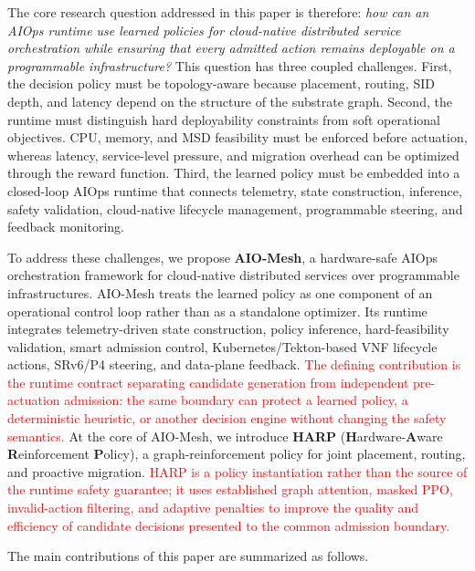 \documentclass[final,5p]{elsarticle}
\newcommand{\rev}[1]{\textcolor{red}{#1}}
\begin{document}
The core research question addressed in this paper is therefore: \emph{how can an AIOps runtime use learned policies for cloud-native distributed service orchestration while ensuring that every admitted action remains deployable on a programmable infrastructure?} This question has three coupled challenges. First, the decision policy must be topology-aware because placement, routing, SID depth, and latency depend on the structure of the substrate graph. Second, the runtime must distinguish hard deployability constraints from soft operational objectives. CPU, memory, and MSD feasibility must be enforced before actuation, whereas latency, service-level pressure, and migration overhead can be optimized through the reward function. Third, the learned policy must be embedded into a closed-loop AIOps runtime that connects telemetry, state construction, inference, safety validation, cloud-native lifecycle management, programmable steering, and feedback monitoring.

To address these challenges, we propose \textbf{AIO-Mesh}, a hardware-safe AIOps orchestration framework for cloud-native distributed services over programmable infrastructures. AIO-Mesh treats the learned policy as one component of an operational control loop rather than as a standalone optimizer. Its runtime integrates telemetry-driven state construction, policy inference, hard-feasibility validation, smart admission control, Kubernetes/Tekton-based VNF lifecycle actions, SRv6/P4 steering, and data-plane feedback. \rev{The defining contribution is the runtime contract separating candidate generation from independent pre-actuation admission: the same boundary can protect a learned policy, a deterministic heuristic, or another decision engine without changing the safety semantics.} At the core of AIO-Mesh, we introduce \textbf{HARP} (\textbf{H}ardware-\textbf{A}ware \textbf{R}einforcement \textbf{P}olicy), a graph-reinforcement policy for joint placement, routing, and proactive migration. \rev{HARP is a policy instantiation rather than the source of the runtime safety guarantee; it uses established graph attention, masked PPO, invalid-action filtering, and adaptive penalties to improve the quality and efficiency of candidate decisions presented to the common admission boundary.}

The main contributions of this paper are summarized as follows.
\end{document}
